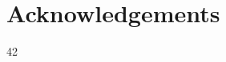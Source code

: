 \documentclass[preamble.tex]{subfiles}
\begin{document}
\pagebreak

\chapter*{Acknowledgements}
42
\end{document}
